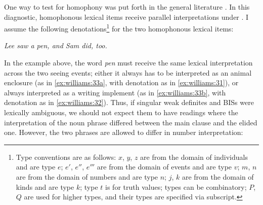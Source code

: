 \documentclass[output=paper,
modfonts
]{langscibook}
\begin{document}
One way to test for homophony was put forth in the general  literature \citep{RullmannYou2006,wilhelm2008}. In this diagnostic, homophonous lexical items receive parallel interpretations under . I assume the following denotations\footnote{Type conventions are as follows: $x$, $y$, $z$ are from the domain of individuals and are type $e$; $e'$, $e''$, $e'''$ are from the domain of events and are type $v$; $m$, $n$ are from the domain of numbers and are type $n$; $j$, $k$ are from the domain of kinds and are type $k$; type $t$ is for truth values; types can be combinatory; $P$, $Q$ are used for higher types, and their types are specified via subscript.} for the two homophonous lexical items: 

\begin{exe}
\end{exe}

\begin{exe}
	\ex \label{ex:williams:33}
	\textit{Lee saw a pen, and Sam did, too.}
	\begin{xlist}
	\end{xlist}
\end{exe} 

In the example above, the word \textit{pen} must receive the same lexical interpretation across the two seeing events; either it always has to be interpreted as an animal enclosure (as in \ref{ex:williams:33a}, with denotation as in \ref{ex:williams:31}), or always interpreted as a writing implement (as in \ref{ex:williams:33b}, with denotation as in \ref{ex:williams:32}). Thus, if singular weak definites and BISs were lexically ambiguous, we should not expect them to have readings where the  interpretation of the noun phrase differed between the main clause and the elided one. However, the two phrases are allowed to differ in number interpretation:
\end{document}
